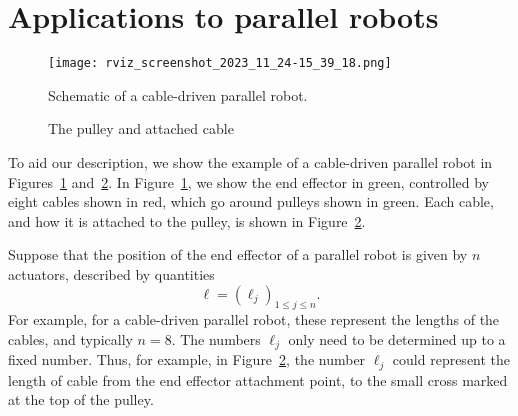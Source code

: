 \documentclass[reqno,12pt]{amsart}
\begin{document}
\section{Applications to parallel robots}

\begin{figure}
\texttt{[image: rviz\_screenshot\_2023\_11\_24-15\_39\_18.png]}
\caption{Schematic of a cable-driven parallel robot.}
\label{cable-driven parallel robot}
\end{figure}

\begin{figure}


\caption{The pulley and attached cable}
\label{pulley}
\end{figure}

To aid our description, we show the example of a cable-driven parallel robot in Figures~\ref{cable-driven parallel robot} and~\ref{pulley}.  In Figure~\ref{cable-driven parallel robot}, we show the end effector in green, controlled by eight cables shown in red, which go around pulleys shown in green.  Each cable, and how it is attached to the pulley, is shown in Figure~\ref{pulley}.

Suppose that the position of the end effector of a parallel robot is given by $n$ actuators, described by quantities
\begin{equation}
\bm \ell = (\ell_j)_{1 \le j \le n} .
\end{equation}
For example, for a cable-driven parallel robot, these represent the lengths of the cables, and typically $n = 8$.  The numbers $\ell_j$ only need to be determined up to a fixed number.  Thus, for example, in Figure~\ref{pulley}, the number $\ell_j$ could represent the length of cable from the end effector attachment point, to the small cross marked at the top of the pulley.
\end{document}
